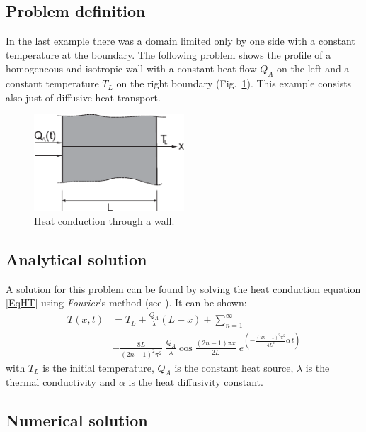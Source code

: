 \subsection{Problem definition}

In the last example there was a domain limited only by one side with a constant temperature at the boundary. The following problem shows the profile of a homogeneous and isotropic wall with a constant heat flow $Q_A$ on the left and a constant temperature $T_L$ on the right boundary (Fig.~\ref{fig-lhdw}). This example consists also just of diffusive heat transport.
\begin{figure}[h]
\centering
\includegraphics[width=0.5\textwidth]{T/figures/LHDW.eps}
\caption{\label{fig-lhdw}Heat conduction through a wall.}
\end{figure}
\subsection{Analytical solution}

A solution for this problem can be found by solving the heat conduction equation \eqref{EqHT} using \textit{Fourier}'s method (see \cite{HaeSamVoi:92}). It can be shown:
\begin{equation}
\begin{split}
	T(x,t) & = T_L+\frac{Q_A}{\lambda}(L-x) + \sum_{n=1}^{\infty} \\ & - \frac{8L}{(2n-1)^2\pi^2}\;\frac{Q_A}{\lambda} \cos{\frac{(2n-1)\pi x}{2L}}\;e^{(-\frac{(2n-1)^2\pi^2}{4L^2}\alpha\,t)}
	\label{eqn:lhdw}
\end{split}
\end{equation}
with $T_L$ is the initial temperature, $Q_A$ is the constant heat source, $\lambda$ is the thermal conductivity and $\alpha$ is the heat diffusivity constant.

\subsection{Numerical solution}
